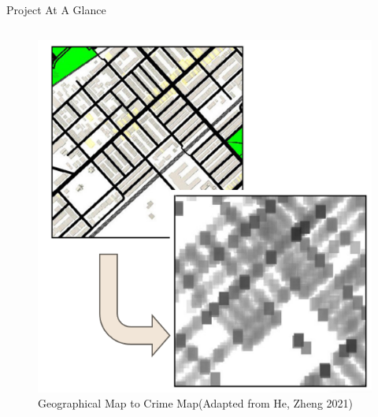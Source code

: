 \documentclass{beamer}
\begin{document}
\begin{frame}{Project At A Glance}
\begin{columns}[T]
        \begin{column}{.5\textwidth}
            \begin{figure}
                \includegraphics[width=\textwidth]{Figures/Intro Figure.png} %
                \caption{Geographical Map to Crime Map(Adapted from He, Zheng 2021)}
            \end{figure}
        \end{column}

    \end{columns}

\end{frame}
\end{document}
